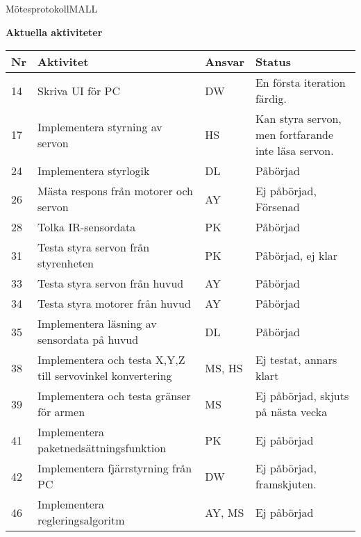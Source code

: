 \documentclass[titlepage, a4paper]{article}
\begin{document}
\begin{projektmote}{Mötesprotokoll}{MALL}
\end{projektmote}

\newpage
\textbf{\Large Aktuella aktiviteter}
\begin{center}
\begin{tabularx}{\textwidth}{| p{4mm} | X | p{13.5mm} | X |}
	\hline
	\textbf{Nr} & \textbf{Aktivitet} & \textbf{Ansvar} & \textbf{Status} \\\hline	
	{14} & {Skriva UI för PC} & {DW} & {En första iteration färdig.} \\\hline
	{17} & {Implementera styrning av servon} & {HS} & {Kan styra servon, men fortfarande inte läsa servon.} \\\hline
	{24} & {Implementera styrlogik} & {DL} & {Påbörjad} \\\hline
	{26} & {Mästa respons från motorer och servon} & {AY} & {Ej påbörjad, Försenad} \\\hline
	{28} & {Tolka IR-sensordata} & {PK} & {Påbörjad} \\\hline
	{31} & {Testa styra servon från styrenheten} & {PK} & {Påbörjad, ej klar} \\\hline
	{33} & {Testa styra servon från huvud} & {AY} & {Påbörjad} \\\hline
	{34} & {Testa styra motorer från huvud} & {AY} & {Påbörjad} \\\hline
	{35} & {Implementera läsning av sensordata på huvud} & {DL} & {Påbörjad} \\\hline
	{38} & {Implementera och testa X,Y,Z  till servovinkel konvertering} & {MS, HS} & {Ej testat, annars klart} \\\hline
	{39} & {Implementera och testa gränser för armen} & {MS} & {Ej påbörjad, skjuts på nästa vecka} \\\hline
	{41} & {Implementera paketnedsättningsfunktion} & {PK} & {Ej påbörjad} \\\hline
	{42} & {Implementera fjärrstyrning från PC} & {DW} & {Ej påbörjad, framskjuten.} \\\hline
	{46} & {Implementera regleringsalgoritm} & {AY, MS} & {Ej påbörjad} \\\hline
\end{tabularx}
\end{center}
\end{document}

